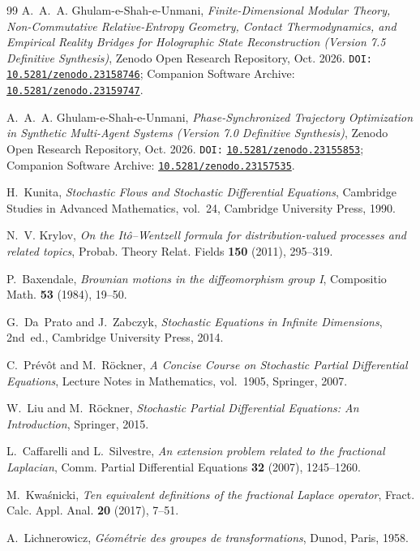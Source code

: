 \documentclass[11pt,a4paper,reqno]{article}
\newcommand{\zenodo}[1]{\href{https://doi.org/10.5281/zenodo.#1}{\nolinkurl{10.5281/zenodo.#1}}}
\theoremstyle{plain}
\theoremstyle{definition}
\theoremstyle{remark}
\numberwithin{equation}{section}
\begin{document}
\begin{thebibliography}{99}
A.~A.~A. Ghulam-e-Shah-e-Unmani,
\emph{Finite-Dimensional Modular Theory, Non-Commutative Relative-Entropy Geometry, Contact Thermodynamics, and Empirical Reality Bridges for Holographic State Reconstruction (Version 7.5 Definitive Synthesis)},
Zenodo Open Research Repository, Oct. 2026.
\texttt{DOI:} \zenodo{23158746}; Companion Software Archive: \zenodo{23159747}.

A.~A.~A. Ghulam-e-Shah-e-Unmani,
\emph{Phase-Synchronized Trajectory Optimization in Synthetic Multi-Agent Systems (Version 7.0 Definitive Synthesis)},
Zenodo Open Research Repository, Oct. 2026.
\texttt{DOI:} \zenodo{23155853}; Companion Software Archive: \zenodo{23157535}.

H.~Kunita,
\emph{Stochastic Flows and Stochastic Differential Equations},
Cambridge Studies in Advanced Mathematics, vol.~24, Cambridge University Press, 1990.

N.~V. Krylov,
\emph{On the It\^o--Wentzell formula for distribution-valued processes and related topics},
Probab. Theory Relat. Fields \textbf{150} (2011), 295--319.

P.~Baxendale,
\emph{Brownian motions in the diffeomorphism group I},
Compositio Math. \textbf{53} (1984), 19--50.

G.~Da~Prato and J.~Zabczyk,
\emph{Stochastic Equations in Infinite Dimensions}, 2nd~ed.,
Cambridge University Press, 2014.

C.~Pr\'ev\^ot and M.~R\"ockner,
\emph{A Concise Course on Stochastic Partial Differential Equations},
Lecture Notes in Mathematics, vol.~1905, Springer, 2007.

W.~Liu and M.~R\"ockner,
\emph{Stochastic Partial Differential Equations: An Introduction},
Springer, 2015.

L.~Caffarelli and L.~Silvestre,
\emph{An extension problem related to the fractional Laplacian},
Comm. Partial Differential Equations \textbf{32} (2007), 1245--1260.

M.~Kwa\'snicki,
\emph{Ten equivalent definitions of the fractional Laplace operator},
Fract. Calc. Appl. Anal. \textbf{20} (2017), 7--51.

A.~Lichnerowicz,
\emph{G\'eom\'etrie des groupes de transformations},
Dunod, Paris, 1958.


\end{thebibliography}
\end{document}
